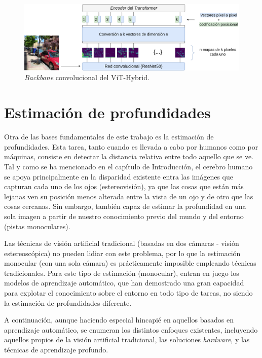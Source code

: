 \begin{figure}[H]
\centering
\includegraphics[width=1\linewidth]{imagenes/vit-hybrid.png} 
\captionsetup{width=.8\linewidth}
\caption{\textit{Backbone} convolucional del ViT-Hybrid.}
\label{fig:hybrid-vit}
\end{figure}

\section{Estimación de profundidades}
Otra de las bases fundamentales de este trabajo es la estimación de profundidades. Esta tarea, tanto cuando es llevada a cabo por humanos como por máquinas, consiste en detectar la distancia relativa entre todo aquello que se ve. Tal y como se ha mencionado en el capítulo de Introducción, el cerebro humano se apoya principalmente en la disparidad existente entra las imágenes que capturan cada uno de los ojos (estereovisión), ya que las cosas que están más lejanas ven su posición menos alterada entre la vista de un ojo y de otro que las cosas cercanas. Sin embargo, también capaz de estimar la profundidad en una sola imagen a partir de nuestro conocimiento previo del mundo y del entorno (pistas monoculares). 

Las técnicas de visión artificial tradicional (basadas en dos cámaras - visión estereoscópica) no pueden lidiar con este problema, por lo que la estimación monocular (con una sola cámara) es prácticamente imposible empleando técnicas tradicionales. Para este tipo de estimación (monocular), entran en juego los modelos de aprendizaje automático, que han demostrado una gran capacidad para explotar el conocimiento sobre el entorno en todo tipo de tareas, no siendo la estimación de profundidades diferente. 

A continuación, aunque haciendo especial hincapié en aquellos basados en aprendizaje automático, se enumeran los distintos enfoques existentes, incluyendo aquellos propios de la visión artificial tradicional, las soluciones \textit{hardware}, y las técnicas de aprendizaje profundo.

